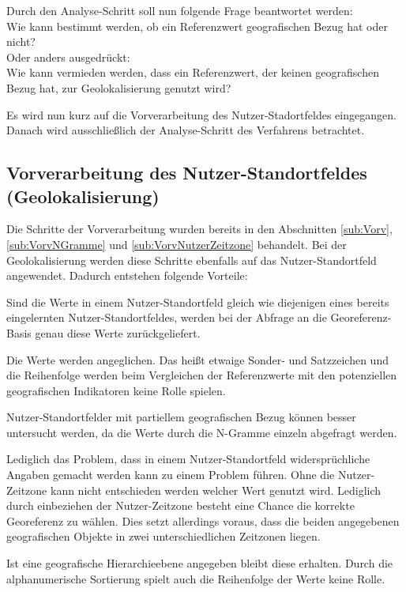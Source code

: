 		Durch den Analyse-Schritt soll nun folgende Frage beantwortet werden: 
		\\ Wie kann bestimmt werden, ob ein Referenzwert geografischen Bezug hat oder nicht? \\
		Oder anders ausgedrückt: 
		\\ Wie kann vermieden werden, dass ein Referenzwert, der keinen geografischen Bezug hat, zur Geolokalisierung genutzt wird?

		Es wird nun kurz auf die Vorverarbeitung des Nutzer-Stadortfeldes eingegangen.
		Danach wird ausschließlich der Analyse-Schritt des Verfahrens betrachtet.

		\subsection{Vorverarbeitung des Nutzer-Standortfeldes (Geolokalisierung)}

			Die Schritte der Vorverarbeitung wurden bereits in den Abschnitten \ref{sub:Vorv}, \ref{sub:VorvNGramme} und \ref{sub:VorvNutzerZeitzone} behandelt. 
			Bei der Geolokalisierung werden diese Schritte ebenfalls auf das Nutzer-Standortfeld angewendet.
			Dadurch entstehen folgende Vorteile:

			Sind die Werte in einem Nutzer-Standortfeld gleich wie diejenigen eines bereits eingelernten Nutzer-Standortfeldes, werden bei der Abfrage an die Georeferenz-Basis genau diese Werte zurückgeliefert.

			Die Werte werden angeglichen. 
			Das heißt etwaige Sonder- und Satzzeichen und die Reihenfolge werden beim Vergleichen der Referenzwerte mit den potenziellen geografischen Indikatoren keine Rolle spielen.
			
			Nutzer-Standortfelder mit partiellem geografischen Bezug können besser untersucht werden, da die Werte durch die N-Gramme einzeln abgefragt werden.

			Lediglich das Problem, dass in einem Nutzer-Standortfeld widersprüchliche Angaben gemacht werden kann zu einem Problem führen. 
			Ohne die Nutzer-Zeitzone kann nicht entschieden werden welcher Wert genutzt wird.
			Lediglich durch einbeziehen der Nutzer-Zeitzone besteht eine Chance die korrekte Georeferenz zu wählen.
			Dies setzt allerdings voraus, dass die beiden angegebenen geografischen Objekte in zwei unterschiedlichen Zeitzonen liegen.

			Ist eine geografische Hierarchieebene angegeben bleibt diese erhalten.
			Durch die alphanumerische Sortierung spielt auch die Reihenfolge der Werte keine Rolle.

